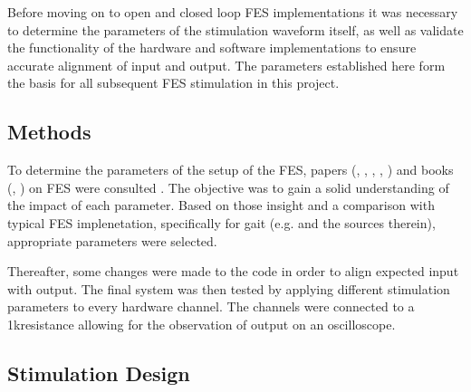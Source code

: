 
Before moving on to open and closed loop FES implementations it was necessary to determine the parameters of the stimulation waveform itself, as well as validate the functionality of the hardware and software implementations to ensure accurate alignment of input and output. The parameters established here form the basis for all subsequent FES stimulation in this project.

\subsection{Methods}
To determine the parameters of the setup of the FES, papers (\cite{peckham_functional_2005}, \cite{lynch_functional_2008}, \cite{marquez-chin_functional_2020}, \cite{bigland-ritchie_muscle_2000}, \cite{vrontos_electrical_2024}) and books (\cite{wood_chapter_2020}, \cite{rupp_functional_2021}) on FES were consulted  . The objective was to gain a solid understanding of the impact of each parameter. Based on those insight and a comparison with typical FES implenetation, specifically for gait (e.g. \cite{aout_effects_2023} and the sources therein), appropriate parameters were selected. 

Thereafter, some changes were made to the code in order to align expected input with output. The final system was then tested by applying different stimulation parameters to every hardware channel. The channels were connected to a 1k\ohm resistance allowing for the observation of output on an oscilloscope. 

\subsection{Stimulation Design}
